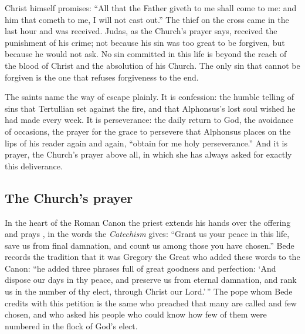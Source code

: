 \noindent Christ himself promises: ``All that the Father giveth to me shall come to me: and him that cometh to me, I will not cast out.'' The thief on the cross came in the last hour and was received. Judas, as the Church's prayer says, received the punishment of his crime; not because his sin was too great to be forgiven, but because he would not ask. No sin committed in this life is beyond the reach of the blood of Christ and the absolution of his Church. The only sin that cannot be forgiven is the one that refuses forgiveness to the end.

The saints name the way of escape plainly. It is confession: the humble telling of sins that Tertullian set against the fire, and that Alphonsus's lost soul wished he had made every week. It is perseverance: the daily return to God, the avoidance of occasions, the prayer for the grace to persevere that Alphonsus places on the lips of his reader again and again, ``obtain for me holy perseverance.'' And it is prayer, the Church's prayer above all, in which she has always asked for exactly this deliverance.

\subsection{The Church's prayer}

In the heart of the Roman Canon the priest extends his hands over the offering and prays , in the words the \emph{Catechism} gives: ``Grant us your peace in this life, save us from final damnation, and count us among those you have chosen.'' Bede records the tradition that it was Gregory the Great who added these words to the Canon: ``he added three phrases full of great goodness and perfection: `And dispose our days in thy peace, and preserve us from eternal damnation, and rank us in the number of thy elect, through Christ our Lord.'\,'' The pope whom Bede credits with this petition is the same who preached that many are called and few chosen, and who asked his people who could know how few of them were numbered in the flock of God's elect.

